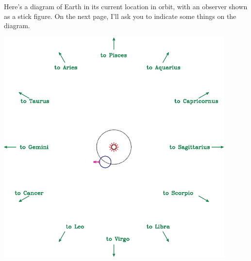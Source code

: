 \documentclass[12pt]{article}
\begin{document}
Here's a diagram of Earth in its current location in orbit, with an observer shown as a stick figure. On the next page, I'll ask you to indicate some things on the diagram.
\begin{center}
\includegraphics [width=0.9\textwidth]{hw-diagram-crop.pdf}
\end{center}

\newpage
\end{document}
